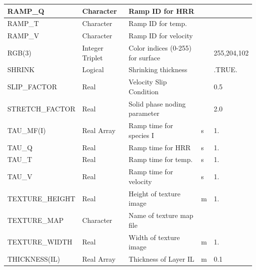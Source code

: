 \documentclass[11pt]{book}
\begin{document}
\begin{longtable}{|l|l|l|l|l|}
{\ct RAMP\_Q}                         & Character       & Ramp ID for HRR                   &                     &                         \\ \hline
{\ct RAMP\_T}                         & Character       & Ramp ID for temp.                 &                     &                         \\ \hline
{\ct RAMP\_V}                         & Character       & Ramp ID for velocity              &                     &                         \\ \hline
{\ct RGB(3)}                          & Integer Triplet & Color indices (0-255) for surface &                     & \small 255,204,102      \\ \hline
{\ct SHRINK}                          & Logical         & Shrinking thickness               &                     & {\ct .TRUE.}            \\ \hline
{\ct SLIP\_FACTOR    }                & Real            & Velocity Slip Condition           &                     & 0.5                     \\ \hline
{\ct STRETCH\_FACTOR    }             & Real            & Solid phase noding parameter      &                     & 2.0                     \\ \hline
{\ct TAU\_MF(I)}                      & Real Array      & Ramp time for species {\ct I}     & s                   & 1.     \\ \hline
{\ct TAU\_Q}                          & Real            & Ramp time for HRR                 & s                   & 1.     \\ \hline
{\ct TAU\_T}                          & Real            & Ramp time for temp.               & s                   & 1.     \\ \hline
{\ct TAU\_V}                          & Real            & Ramp time for velocity            & s                   & 1.     \\ \hline
{\ct TEXTURE\_HEIGHT}                 & Real            & Height of texture image           & m                   & 1.     \\ \hline
{\ct TEXTURE\_MAP}                    & Character       & Name of texture map file          &                     &        \\ \hline
{\ct TEXTURE\_WIDTH}                  & Real            & Width of texture image            & m                   & 1.     \\ \hline
{\ct THICKNESS(IL)}                   & Real Array      & Thickness of Layer {\ct IL}       & m                   & 0.1    \\ \hline

\end{longtable}
\end{document}

